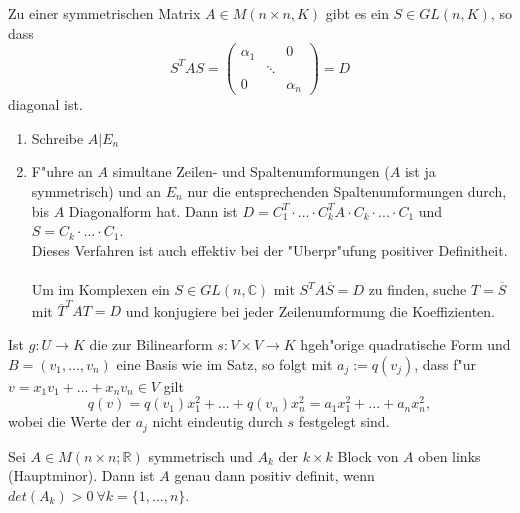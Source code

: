 \documentclass[11pt, a4paper]{article}
\begin{document}
\begin{corollary}
Zu einer symmetrischen Matrix $A \in M(n \times n, K)$ gibt es ein $S \in GL(n, K)$, so dass 
$$
S^T A S = \left(\begin{array}{ccc}\alpha_{1} & & 0 
\\ & \ddots & 
\\ 0 & & \alpha_{n}\end{array}\right) = D
$$
diagonal ist.
\end{corollary}

\begin{remark} 
\begin{enumerate}
\item Schreibe $A | E_n$
\item F"uhre an $A$ simultane Zeilen- und Spaltenumformungen ($A$ ist ja symmetrisch) und an $E_n$ nur die entsprechenden Spaltenumformungen durch, bis $A$ Diagonalform hat. Dann ist $D = C_1^T \cdot ... \cdot C_k^T A \cdot C_k \cdot ... \cdot C_1$ und $S = C_k \cdot ... \cdot C_1$.
\\ Dieses Verfahren ist auch effektiv bei der "Uberpr"ufung positiver Definitheit.
\\
\\
Um im Komplexen ein $S \in GL(n, \mathbb{C})$ mit $S^T A \overline{S} = D$ zu finden, suche $T = \overline{S}$ mit $\overline{T}^T A T = D$ und konjugiere bei jeder Zeilenumformung die Koeffizienten.
\end{enumerate}


\end{remark}

\begin{remark}
Ist $g : U \rightarrow K$ die zur Bilinearform $s : V \times V \rightarrow K$ hgeh"orige quadratische Form und $B = (v_1, ... , v_n)$ eine Basis wie im Satz, so folgt mit $a_j := q(v_j)$, dass f"ur $v = x_1 v_1 + ... + x_n v_n \in V$ gilt 
$$
q(v) = q(v_1) x_1^2 + ... + q(v_n) x_n^2 = a_1 x_1^2 + ... + a_n x_n^2,
$$
wobei die Werte der $a_j$ nicht eindeutig durch $s$ festgelegt sind.

\end{remark}

\begin{theorem}
Sei $A \in M(n \times n; \mathbb{R})$ symmetrisch und $A_k$ der $k\times k$ Block von $A$ oben links (Hauptminor). Dann ist $A$ genau dann positiv definit, wenn $det(A_k) > 0 \ \forall k = \{1, ..., n\}$.
\end{theorem}
\end{document}
